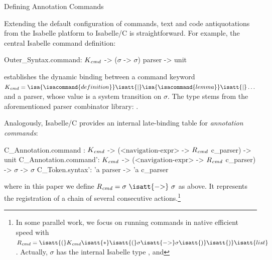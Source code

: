 \begin{isabellebody}
\begin{isamarkupsubsection*}
[label = {annot1},type = {scholarly_paper.technical}, args={label = {annot1},type = {scholarly_paper.technical}, Isa_COL.text_element.level = {}, Isa_COL.text_element.referentiable = {False}, Isa_COL.text_element.variants = {{STR ''outline'', STR ''document''}}, scholarly_paper.text_section.main_author = {}, scholarly_paper.text_section.fixme_list = {}, Isa_COL.text_element.level = {}, scholarly_paper.technical.definition_list = {}}]Defining Annotation Commands%
\end{isamarkupsubsection*}\isamarkuptrue%
%
\begin{isamarkuptext}%
Extending the default configuration of commands, text and code antiquotations from the
Isabelle platform to Isabelle/C is straightforward. For example, the central Isabelle command
definition:
\begin{isar}
    Outer_Syntax.command: $K_\text{\emph{cmd}}$ -> ($\sigma$ -> $\sigma$) parser -> unit
\end{isar}
establishes the dynamic binding between a command keyword $K_\text{\emph{cmd}} =
\isa{\isacommand{definition}} \isatt{|}
\isa{\isacommand{lemma}} \isatt{|} \dots $ and a parser, whose value is
a system transition on $\sigma$. The  type stems from the
aforementioned parser combinator library: 
\isatt{=} .%
\end{isamarkuptext}\isamarkuptrue%
%
\begin{isamarkuptext}%
Analogously, Isabelle/C provides an internal late-binding table for
\emph{annotation commands}:
\begin{isar}
    C_Annotation.command : $K_\text{\emph{cmd}}$ -> ($\text{<navigation-expr>}$ -> $R_\text{\emph{cmd}}$ c_parser) -> unit
    C_Annotation.command': $K_\text{\emph{cmd}}$ -> ($\text{<navigation-expr>}$ -> $R_\text{\emph{cmd}}$ c_parser) -> $\sigma$ -> $\sigma$
    C_Token.syntax': 'a parser -> 'a c_parser
\end{isar}
where in this paper we define $R_\text{\emph{cmd}} = \sigma~\isatt{{\char`\-}{\char`\>}}~\sigma$ as
above. It represents the registration of a chain of several consecutive actions.\footnote{In
  some parallel work, we focus on running commands in native efficient speed with
  $R_\text{\emph{cmd}} = \isatt{(} K_\text{\emph{cmd}} \isatt{*}
  \isatt{(}\sigma \isatt{{\char`\-}{\char`\>}} \sigma \isatt{)}
  \isatt{)} \isatt{list}$ \cite{DBLP:journals/afp/TuongW15}. Actually, $\sigma$ has the internal Isabelle type
  , and
}
\end{isamarkuptext}
\end{isabellebody}
